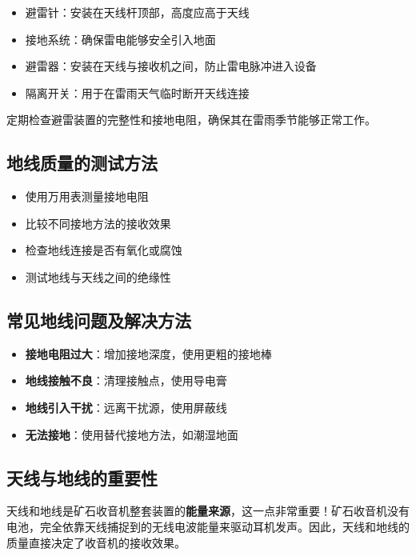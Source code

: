 \documentclass[12pt,UTF8]{ctexbook}
\begin{document}
\begin{itemize}[leftmargin=3.5em]
    \item 避雷针：安装在天线杆顶部，高度应高于天线
    \item 接地系统：确保雷电能够安全引入地面
    \item 避雷器：安装在天线与接收机之间，防止雷电脉冲进入设备
    \item 隔离开关：用于在雷雨天气临时断开天线连接
\end{itemize}

定期检查避雷装置的完整性和接地电阻，确保其在雷雨季节能够正常工作。

\subsection{地线质量的测试方法}

\begin{itemize}[leftmargin=3.5em]
    \item 使用万用表测量接地电阻
    \item 比较不同接地方法的接收效果
    \item 检查地线连接是否有氧化或腐蚀
    \item 测试地线与天线之间的绝缘性
\end{itemize}

\subsection{常见地线问题及解决方法}

\begin{itemize}[leftmargin=3.5em]
    \item \textbf{接地电阻过大}：增加接地深度，使用更粗的接地棒
    \item \textbf{地线接触不良}：清理接触点，使用导电膏
    \item \textbf{地线引入干扰}：远离干扰源，使用屏蔽线
    \item \textbf{无法接地}：使用替代接地方法，如潮湿地面
\end{itemize}

\subsection{天线与地线的重要性}

天线和地线是矿石收音机整套装置的\textbf{能量来源}，这一点非常重要！矿石收音机没有电池，完全依靠天线捕捉到的无线电波能量来驱动耳机发声。因此，天线和地线的质量直接决定了收音机的接收效果。
\end{document}
